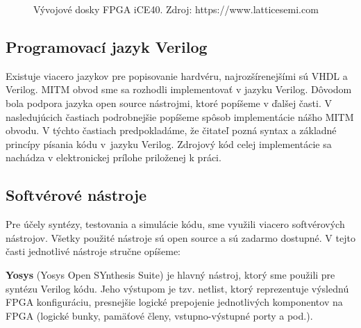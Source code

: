\begin{figure}
    \centering
    \hfill
    \caption[Vývojové dosky FPGA iCE40]{Vývojové dosky FPGA iCE40. Zdroj: https://www.latticesemi.com}
    \label{obr:iceHw}
\end{figure}

\subsection{Programovací jazyk Verilog}
Existuje viacero jazykov pre popisovanie hardvéru, najrozšírenejšími sú VHDL a Verilog. MITM obvod sme sa rozhodli implementovať v jazyku Verilog. Dôvodom bola podpora jazyka open source nástrojmi, ktoré popíšeme v ďalšej časti. V nasledujúcich častiach podrobnejšie popíšeme spôsob implementácie nášho MITM obvodu. V týchto častiach predpokladáme, že čitateľ pozná syntax a základné princípy písania kódu v~jazyku Verilog. Zdrojový kód celej implementácie sa nachádza v elektronickej prílohe priloženej k práci.

\subsection{Softvérové nástroje}\label{subsek:software}
Pre účely syntézy, testovania a simulácie kódu, sme využili viacero softvérových nástrojov. Všetky použité nástroje sú open source a sú zadarmo dostupné. V tejto časti jednotlivé nástroje stručne opíšeme:

\textbf{Yosys} (Yosys Open SYnthesis Suite) \cite{yosys} je hlavný nástroj, ktorý sme použili pre syntézu Verilog kódu. Jeho výstupom je tzv. netlist, ktorý reprezentuje výslednú FPGA konfiguráciu, presnejšie logické prepojenie jednotlivých komponentov na FPGA (logické bunky, pamäťové členy, vstupno-výstupné porty a pod.).

